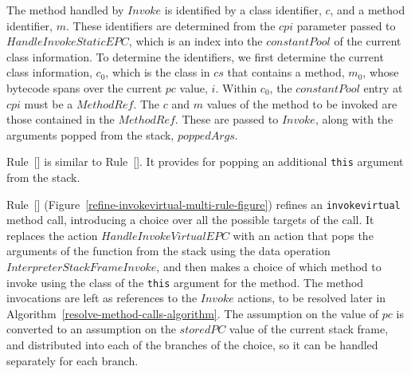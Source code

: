 The method handled by $Invoke$ is identified by a class identifier,
$c$, and a method identifier, $m$.
These identifiers are determined from the $cpi$ parameter passed to
$HandleInvokeStaticEPC$, which is an index into the $constantPool$ of
the current class information.
To determine the identifiers, we first determine the current class
information, $c_0$, which is the class in $cs$ that contains a method,
$m_0$, whose bytecode spans over the current $pc$ value, $i$.
Within $c_0$, the $constantPool$ entry at $cpi$ must be a $MethodRef$.
The $c$ and $m$ values of the method to be invoked are those contained
in the $MethodRef$.
These are passed to $Invoke$, along with the arguments popped from the
stack, $poppedArgs$.

Rule~[] is similar to
Rule~[].
It provides for popping an additional \texttt{this} argument from the
stack.

Rule~[]
(Figure~\ref{refine-invokevirtual-multi-rule-figure}) refines an
\texttt{invokevirtual} method call, introducing a choice over all the
possible targets of the call.
It replaces the action $HandleInvokeVirtualEPC$ with an action that
pops the arguments of the function from the stack using the data
operation $InterpreterStackFrameInvoke$, and then makes a choice of
which method to invoke using the class of the \texttt{this} argument
for the method.
The method invocations are left as references to the $Invoke$ actions,
to be resolved later in
Algorithm~\ref{resolve-method-calls-algorithm}.
The assumption on the value of $pc$ is converted to an assumption on
the $storedPC$ value of the current stack frame, and distributed into
each of the branches of the choice, so it can be handled separately
for each branch.

